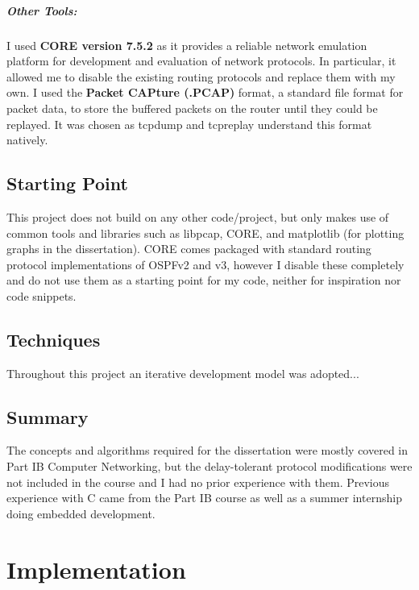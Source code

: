 \documentclass[withindex,glossary,openany]{cam-thesis}
\begin{document}
\paragraph{Other Tools:}

I used \textbf{CORE version 7.5.2} as it provides a reliable network emulation platform for development and evaluation of network protocols. In particular, it allowed me to disable the existing routing protocols and replace them with my own. I used the \textbf{Packet CAPture (.PCAP)} format, a standard file format for packet data, to store the buffered packets on the router until they could be replayed. It was chosen as tcpdump and tcpreplay understand this format natively.


\section{Starting Point}

This project does not build on any other code/project, but only makes use of common tools and libraries such as libpcap, CORE, and matplotlib (for plotting graphs in the dissertation). CORE comes packaged with standard routing protocol implementations of OSPFv2 and v3, however I disable these completely and do not use them as a starting point for my code, neither for inspiration nor code snippets.

\section{Techniques}

Throughout this project an iterative development model was adopted...

\section{Summary}

The concepts and algorithms required for the dissertation were mostly covered in Part IB Computer Networking, but the delay-tolerant protocol modifications were not included in the course and I had no prior experience with them. Previous experience with C came from the Part IB course as well as a summer internship doing embedded development.

\chapter{Implementation}
\end{document}
